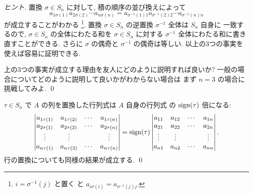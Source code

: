 \documentclass[12pt,twoside]{jarticle}
\begin{document}
\begin{proof}[ヒント]
  置換 $\sigma\in S_n$ に対して, 積の順序の並び換えによって
  \begin{equation*}
    a_{1\sigma(1)}a_{2\sigma(2)}\cdots a_{n\sigma(n)} 
    =
    a_{\sigma^{-1}(1)1}a_{\sigma^{-1}(2)2}\cdots a_{\sigma^{-1}(n)n}
  \end{equation*}
  が成立することがわかる%
  \footnote{$i=\sigma^{-1}(j)$ と置く
    と $a_{i\sigma(i)}=a_{\sigma^{-1}(j)j}$.}. 
  置換 $\sigma\in S_n$ の逆置換 $\sigma^{-1}$ 全体は $S_n$ 自身に
  一致するので, $\sigma\in S_n$ の全体にわたる和を $\sigma\in S_n$ 
  に対する $\sigma^{-1}$ 全体にわたる和に書き直すことができる.
  さらに $\sigma$ の偶奇と $\sigma^{-1}$ の偶奇は等しい.
  以上の3つの事実を使えば容易に証明できる.

  上の3つの事実が成立する理由を友人にどのように説明すれば良いか?
  一般の場合についてどのように説明して良いかがわからない場合は
  まず $n=3$ の場合に挑戦してみよ.
  \qed
\end{proof}


\begin{question}[列や行の置換]
  \label{q:perm-det}
  $\tau\in S_n$ で $A$ の列を置換した行列式は $A$ 自身の行列式
  の $\mathop{\mathrm{sign}}\nolimits(\tau)$ 倍になる:
  \begin{equation*}
    \begin{vmatrix}
      a_{1\tau(1)} & a_{1\tau(2)} & \cdots & a_{1\tau(n)} \\
      a_{2\tau(1)} & a_{2\tau(2)} & \cdots & a_{2\tau(n)} \\
      \vdots         & \vdots         &        & \vdots         \\
      a_{n\tau(1)} & a_{n\tau(2)} & \cdots & a_{n\tau(n)} \\
    \end{vmatrix}
    = \mathop{\mathrm{sign}}\nolimits(\tau)
    \begin{vmatrix}
      a_{11} & a_{12} & \cdots & a_{1n} \\
      a_{21} & a_{22} & \cdots & a_{2n} \\
      \vdots & \vdots &        & \vdots \\
      a_{n1} & a_{n2} & \cdots & a_{nn} \\
    \end{vmatrix}.
  \end{equation*}
  行の置換についても同様の結果が成立する. 
  \qed
\end{question}
\end{document}
